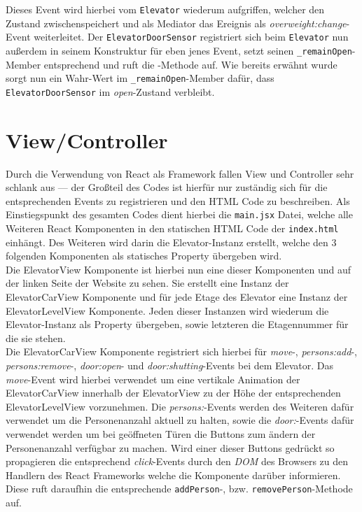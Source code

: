 Dieses Event wird hierbei vom \texttt{Elevator} wiederum aufgriffen, welcher den Zustand zwischenspeichert und als Mediator das Ereignis als \textit{overweight:change}-Event weiterleitet.
Der \texttt{ElevatorDoorSensor} registriert sich beim \texttt{Elevator} nun außerdem in seinem Konstruktur für eben jenes Event, setzt seinen \texttt{\_remainOpen}-Member entsprechend und ruft die -Methode auf.
Wie bereits erwähnt wurde sorgt nun ein Wahr-Wert im \texttt{\_remainOpen}-Member dafür, dass \texttt{ElevatorDoorSensor} im \textit{open}-Zustand verbleibt.

\section{View/Controller}
\label{imp_vc}
Durch die Verwendung von React als Framework fallen View und Controller sehr schlank aus --- der Großteil des Codes ist hierfür nur zuständig sich für die entsprechenden Events zu registrieren und den HTML Code zu beschreiben.
Als Einstiegspunkt des gesamten Codes dient hierbei die \texttt{main.jsx} Datei, welche alle Weiteren React Komponenten in den statischen HTML Code der \texttt{index.html} einhängt.
Des Weiteren wird darin die Elevator-Instanz erstellt, welche den 3 folgenden Komponenten als statisches Property übergeben wird. \\

Die ElevatorView Komponente ist hierbei nun eine dieser Komponenten und auf der linken Seite der Website zu sehen.
Sie erstellt eine Instanz der ElevatorCarView Komponente und für jede Etage des Elevator eine Instanz der ElevatorLevelView Komponente.
Jeden dieser Instanzen wird wiederum die Elevator-Instanz als Property übergeben, sowie letzteren die Etagennummer für die sie stehen. \\

Die ElevatorCarView Komponente registriert sich hierbei für \textit{move}-, \textit{persons:add}-, \textit{persons:remove}-, \textit{door:open}- und \textit{door:shutting}-Events bei dem Elevator.
Das \textit{move}-Event wird hierbei verwendet um eine vertikale Animation der ElevatorCarView innerhalb der ElevatorView zu der Höhe der entsprechenden ElevatorLevelView vorzunehmen.
Die \textit{persons:}-Events werden des Weiteren dafür verwendet um die Personenanzahl aktuell zu halten, sowie die \textit{door:}-Events dafür verwendet werden um bei geöffneten Türen die Buttons zum ändern der Personenanzahl verfügbar zu machen.
Wird einer dieser Buttons gedrückt so propagieren die entsprechend \textit{click}-Events durch den \textit{DOM} des Browsers zu den Handlern des React Frameworks welche die Komponente darüber informieren.
Diese ruft daraufhin die entsprechende \texttt{addPerson}-, bzw. \texttt{removePerson}-Methode auf. \\

